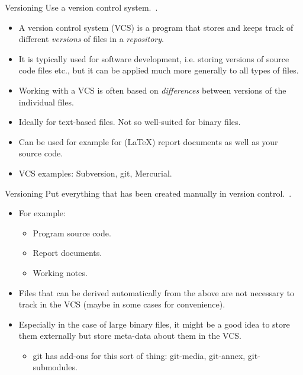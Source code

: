 \documentclass[english]{beamer}
\begin{document}

\begin{frame}{\insertsection}{Versioning}
  Use a version control system.~\cite{Wilson2013}.
  \begin{itemize}
  \item A version control system (VCS) is a program that stores and
    keeps track of different \emph{versions} of files in a
    \emph{repository}.
  \item It is typically used for software development, i.e. storing
    versions of source code files etc., but it can be applied much
    more generally to all types of files.
  \item Working with a VCS is often based on \emph{differences}
    between versions of the individual files.
  \item Ideally for text-based files. Not so well-suited for binary
    files.
  \item Can be used for example for (LaTeX) report documents as well
    as your source code.
  \item VCS examples: Subversion, git, Mercurial.
  \end{itemize}
\end{frame}


\begin{frame}{\insertsection}{Versioning}
  Put everything that has been created manually in version
  control.~\cite{Wilson2013}.
  \begin{itemize}
  \item For example:
    \begin{itemize}
    \item Program source code.
    \item Report documents.
    \item Working notes.
    \end{itemize}
  \item Files that can be derived automatically from the above are not
    necessary to track in the VCS (maybe in some cases for
    convenience).
  \item Especially in the case of large binary files, it might be a
    good idea to store them externally but store meta-data about them
    in the VCS.
    \begin{itemize}
    \item git has add-ons for this sort of thing: git-media,
      git-annex, git-submodules.
    \end{itemize}
  \end{itemize}
\end{frame}
\end{document}
